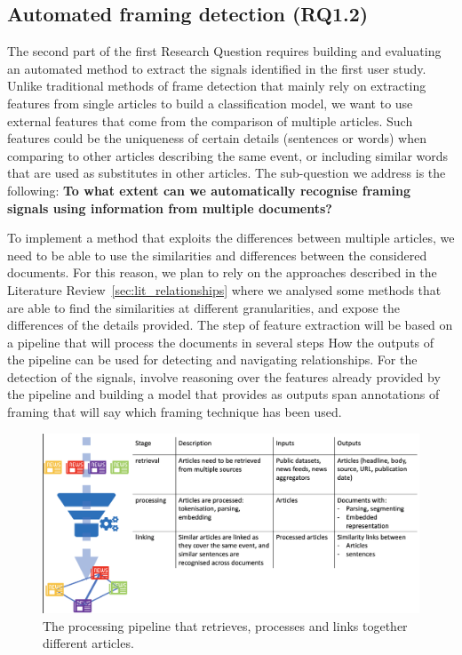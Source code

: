 \subsection{Automated framing detection (RQ1.2)}

The second part of the first Research Question requires building and evaluating an automated method to extract the signals identified in the first user study.
Unlike traditional methods of frame detection that mainly rely on extracting features from single articles to build a classification model, we want to use external features that come from the comparison of multiple articles. Such features could be the uniqueness of certain details (sentences or words) when comparing to other articles describing the same event, or including similar words that are used as substitutes in other articles.
The sub-question we address is the following:
\textbf{To what extent can we automatically recognise framing signals using information from multiple documents?}

To implement a method that exploits the differences between multiple articles, we need to be able to use the similarities and differences between the considered documents.
For this reason, we plan to rely on the approaches described in the Literature Review~\ref{sec:lit_relationships} where we analysed some methods that are able to find the similarities at different granularities, and expose the differences of the details provided.
The step of feature extraction will be based on a pipeline that will process the documents in several steps
How the outputs of the pipeline can be used for detecting and navigating relationships.
For the detection of the signals, involve reasoning over the features already provided by the pipeline and building a model that provides as outputs span annotations of framing that will say which framing technique has been used.

\begin{figure}[!htb]
    \centering
    \includegraphics[width=\textwidth]{figures/figure_pipeline.png}
    \caption{The processing pipeline that retrieves, processes and links together different articles.}
    \label{fig:pipeline}
\end{figure}

